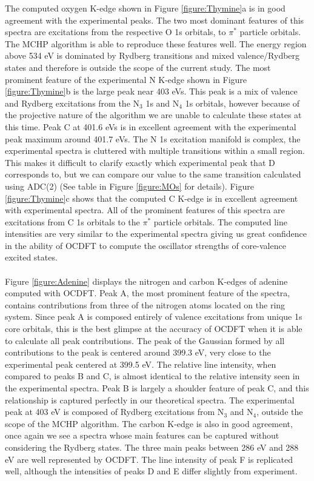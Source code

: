 \documentclass[11.5pt]{article}
\begin{document}
\noindent The computed oxygen K-edge shown in Figure \ref{figure:Thymine}a is in good agreement with the experimental peaks. The two most dominant features of this spectra are excitations from the respective O 1s orbitals, to $\pi^*$ particle orbitals. The MCHP algorithm is able to reproduce these features well. The energy region above 534 eV is dominated by Rydberg transitions and mixed valence/Rydberg states and therefore is outside the scope of the current study. The most prominent feature of the experimental N K-edge shown in Figure \ref{figure:Thymine}b is the large peak near 403 eVs. This peak is a mix of valence and Rydberg excitations from the N$_3$ 1s and N$_4$ 1s orbitals, however because of the projective nature of the algorithm we are unable to calculate these states at this time. Peak C at 401.6 eVs is in excellent agreement with the experimental peak maximum around 401.7 eVs. The N 1s excitation manifold is complex, the experimental spectra is cluttered with multiple transitions within a small region. This makes it difficult to clarify exactly which experimental peak that D corresponds to, but we can compare our value to the same transition calculated using ADC(2) (See table in Figure \ref{figure:MOs} for details). Figure \ref{figure:Thymine}c shows that the computed C K-edge is in excellent agreement with experimental spectra. All of the prominent features of this spectra are excitations from C 1s orbitals to the $\pi^*$ particle orbitals. The computed line intensities are very similar to the experimental spectra giving us great confidence in the ability of OCDFT to compute the oscillator strengths of core-valence excited states.
\\ \\
Figure \ref{figure:Adenine} displays the nitrogen and carbon K-edges of adenine computed with OCDFT. Peak A, the most prominent feature of the spectra, contains contributions from three of the nitrogen atoms located on the ring system. Since peak A is composed entirely of valence excitations from unique 1s core orbitals, this is the best glimpse at the accuracy of OCDFT when it is able to calculate all peak contributions. The peak of the Gaussian formed by all contributions to the peak is centered around 399.3 eV, very close to the experimental peak centered at 399.5 eV. The relative line intensity, when compared to peaks B and C, is almost identical to the relative intensity seen in the experimental spectra. Peak B is largely a shoulder feature of peak C, and this relationship is captured perfectly in our theoretical spectra. The experimental peak at 403 eV is composed of Rydberg excitations from N$_3$ and N$_4$, outside the scope of the MCHP algorithm. The carbon K-edge is also in good agreement, once again we see a spectra whose main features can be captured without considering the Rydberg states. The three main peaks between 286 eV and 288 eV are well represented by OCDFT. The line intensity of peak F is replicated well, although the intensities of peaks D and E differ slightly from experiment. \\
\end{document}
